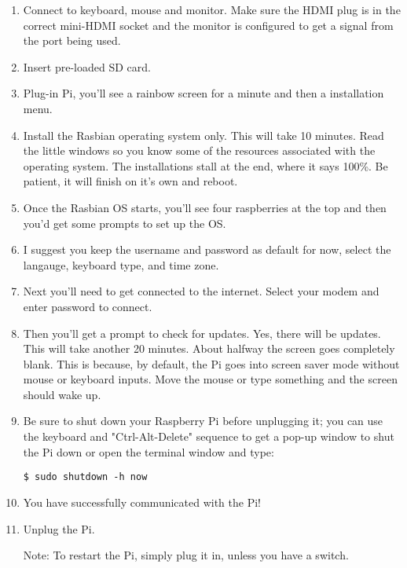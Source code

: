 \documentclass{article}\usepackage[]{graphicx}\usepackage[]{color}
\begin{document}
\begin{enumerate}

\item Connect to keyboard, mouse and monitor. Make sure the HDMI plug is in the correct mini-HDMI socket and the monitor is configured to get a signal from the port being used.

\item Insert pre-loaded SD card.

\item Plug-in Pi, you'll see a rainbow screen for a minute and then a installation menu. 

\item Install the Rasbian operating system only. This will take 10 minutes. Read the little windows so you know some of the resources associated with the operating system. The installations stall at the end, where it says 100\%. Be patient, it will finish on it's own and reboot.

\item Once the Rasbian OS starts, you'll see four raspberries at the top and then you'd get some prompts to set up the OS. 

\item I suggest you keep the username and password as default for now, select the langauge, keyboard type, and time zone. 

\item Next you'll need to get connected to the internet. Select your modem and enter password to connect.

\item Then you'll get a prompt to check for updates. Yes, there will be updates. This will take another 20 minutes. About halfway the screen goes completely blank. This is because, by default, the Pi goes into screen saver mode without mouse or keyboard inputs. Move the mouse or type something and the screen should wake up. 

\item Be sure to shut down your Raspberry Pi before unplugging it; you can use the keyboard and "Ctrl-Alt-Delete" sequence to get a pop-up window to shut the Pi down or open the terminal window and type:

\begin{lstlisting}
$ sudo shutdown -h now
\end{lstlisting}

\item You have successfully communicated with the Pi!  

\item Unplug the Pi.

Note: To restart the Pi, simply plug it in, unless you have a switch. 

\end{enumerate}
\end{document}

